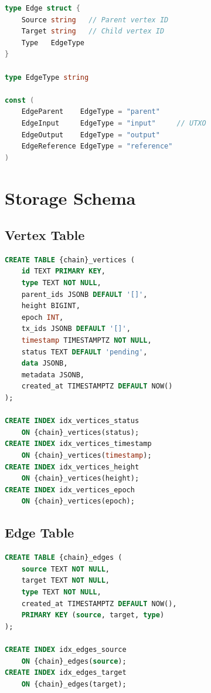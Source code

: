 \documentclass[11pt,twocolumn]{article}
\begin{document}
\begin{lstlisting}[language=Go,caption={DAG edge definition}]
type Edge struct {
    Source string   // Parent vertex ID
    Target string   // Child vertex ID
    Type   EdgeType
}

type EdgeType string

const (
    EdgeParent    EdgeType = "parent"
    EdgeInput     EdgeType = "input"     // UTXO
    EdgeOutput    EdgeType = "output"
    EdgeReference EdgeType = "reference"
)
\end{lstlisting}

\section{Storage Schema}

\subsection{Vertex Table}

\begin{lstlisting}[language=SQL,caption={Vertex storage schema}]
CREATE TABLE {chain}_vertices (
    id TEXT PRIMARY KEY,
    type TEXT NOT NULL,
    parent_ids JSONB DEFAULT '[]',
    height BIGINT,
    epoch INT,
    tx_ids JSONB DEFAULT '[]',
    timestamp TIMESTAMPTZ NOT NULL,
    status TEXT DEFAULT 'pending',
    data JSONB,
    metadata JSONB,
    created_at TIMESTAMPTZ DEFAULT NOW()
);

CREATE INDEX idx_vertices_status
    ON {chain}_vertices(status);
CREATE INDEX idx_vertices_timestamp
    ON {chain}_vertices(timestamp);
CREATE INDEX idx_vertices_height
    ON {chain}_vertices(height);
CREATE INDEX idx_vertices_epoch
    ON {chain}_vertices(epoch);
\end{lstlisting}

\subsection{Edge Table}

\begin{lstlisting}[language=SQL,caption={Edge storage schema}]
CREATE TABLE {chain}_edges (
    source TEXT NOT NULL,
    target TEXT NOT NULL,
    type TEXT NOT NULL,
    created_at TIMESTAMPTZ DEFAULT NOW(),
    PRIMARY KEY (source, target, type)
);

CREATE INDEX idx_edges_source
    ON {chain}_edges(source);
CREATE INDEX idx_edges_target
    ON {chain}_edges(target);
\end{lstlisting}
\end{document}
